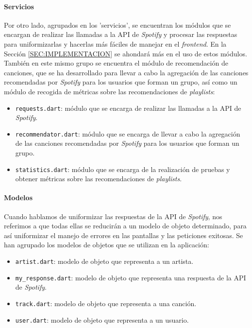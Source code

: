 \paragraph{Servicios}

Por otro lado, agrupados en los 'servicios', se encuentran los módulos que se encargan de realizar las llamadas a la API de \textit{Spotify} y procesar las respuestas para uniformizarlas
y hacerlas más fáciles de manejar en el \textit{frontend}. En la Sección \ref{SEC:IMPLEMENTACION} se ahondará más en el uso de estos módulos. También en este mismo grupo se encuentra el módulo
de recomendación de canciones, que se ha desarrollado para llevar a cabo la agregación de las canciones recomendadas por \textit{Spotify} para los usuarios que forman un grupo,
así como un módulo de recogida de métricas sobre las recomendaciones de \textit{playlists}:

\begin{itemize}
  \item \texttt{requests.dart}: módulo que se encarga de realizar las llamadas a la API de \textit{Spotify}.
  \item \texttt{recommendator.dart}: módulo que se encarga de llevar a cabo la agregación de las canciones recomendadas por \textit{Spotify} para los usuarios que forman un grupo.
  \item \texttt{statistics.dart}: módulo que se encarga de la realización de pruebas y obtener métricas sobre las recomendaciones de \textit{playlists}.
\end{itemize}

\paragraph{Modelos}

Cuando hablamos de uniformizar las respuestas de la API de \textit{Spotify}, nos referimos a que todas ellas se reducirán a un modelo de objeto determinado, para así uniformizar el manejo de
errores en las pantallas y las peticiones exitosas. Se han agrupado los modelos de objetos que se utilizan en la aplicación:

\begin{itemize}
  \item \texttt{artist.dart}: modelo de objeto que representa a un artista.
  \item \texttt{my\_response.dart}: modelo de objeto que representa una respuesta de la API de \textit{Spotify}.
  \item \texttt{track.dart}: modelo de objeto que representa a una canción.
  \item \texttt{user.dart}: modelo de objeto que representa a un usuario.
\end{itemize}



